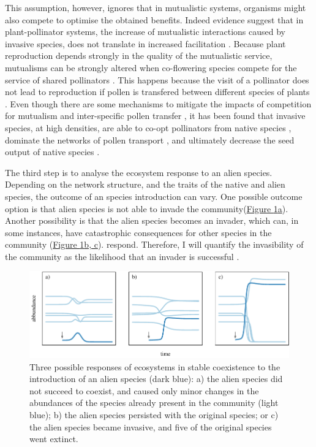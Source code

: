 \documentclass[a4paper]{article}
\begin{document}
This assumption, however, ignores that in mutualistic systems, organisms might also compete to optimise the obtained benefits.
Indeed evidence suggest that in plant-pollinator systems, the increase of mutualistic interactions caused by invasive species, does not translate in increased facilitation \citep{Lopezaraiza-Mikel2007}.
Because plant reproduction depends strongly in the quality of the mutualistic service, mutualisms can be strongly altered when co-flowering species compete for the service of shared pollinators \citep{Sargent2008, Mitchell2009}.
This happens because the visit of a pollinator does not lead to reproduction if pollen is transfered between different species of plants \citep{Morales2008}.
Even though there are some mechanisms to mitigate the impacts of competition for mutualism and inter-specific pollen transfer \citep{Ghazoul2006, Bartomeus2008a}, it has been found that invasive species, at high densities, are able to co-opt pollinators from native species \citep{Pysek2011}, dominate the networks of pollen transport \citep{Lopezaraiza-Mikel2007, Alarcon2010}, and ultimately decrease the seed output of native species \citep{Munoz2008}.

The third step is to analyse the ecosystem response to an alien species.
Depending on the network structure, and the traits of the native and alien species, the outcome of an species introduction can vary.
One possible outcome option is that alien species is not able to invade the community(\hyperref[fig:dynamics]{Figure \ref{fig:dynamics}a}).
Another possibility is that the alien species becomes an invader, which can, in some instances, have catastrophic consequences for other species in the community (\hyperref[fig:dynamics]{Figure \ref{fig:dynamics}b, c}).
respond.
Therefore, I will quantify the invasibility of the community as the likelihood that an invader is successful \citep{Ives2007, Romanuk2009}.

\begin{figure}[tbp]
  \includegraphics{dynamics}
  \caption{
  \label{fig:dynamics}
  Three possible responses of ecosystems in stable coexistence to the introduction of an alien species (dark blue):
  a) the alien species did not succeed to coexist, and caused only minor changes in the abundances of the species already present in the community (light blue);
  b) the alien species persisted with the original species; or
  c) the alien species became invasive, and five of the original species went extinct.
  }
\end{figure}
\end{document}
